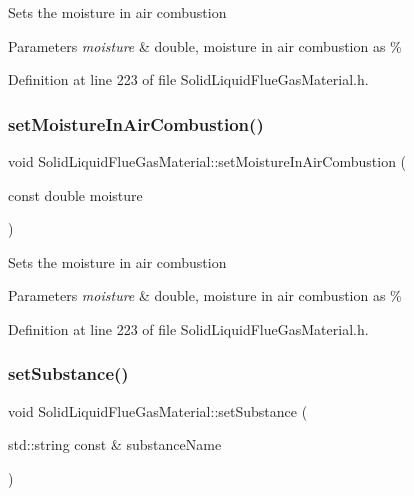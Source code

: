 Sets the moisture in air combustion 
\begin{DoxyParams}{Parameters}
{\em moisture} & double, moisture in air combustion as \% \\
\hline
\end{DoxyParams}


Definition at line 223 of file Solid\+Liquid\+Flue\+Gas\+Material.\+h.

\mbox{\label{class_solid_liquid_flue_gas_material_a1a5f1bd3008e78cce62edb8aca642284}} 
\subsubsection{\texorpdfstring{set\+Moisture\+In\+Air\+Combustion()}{setMoistureInAirCombustion()}\hspace{0.1cm}{\footnotesize\ttfamily [3/3]}}
{\footnotesize\ttfamily void Solid\+Liquid\+Flue\+Gas\+Material\+::set\+Moisture\+In\+Air\+Combustion (\begin{DoxyParamCaption}\item[{const double}]{moisture }\end{DoxyParamCaption})\hspace{0.3cm}{\ttfamily [inline]}}

Sets the moisture in air combustion 
\begin{DoxyParams}{Parameters}
{\em moisture} & double, moisture in air combustion as \% \\
\hline
\end{DoxyParams}


Definition at line 223 of file Solid\+Liquid\+Flue\+Gas\+Material.\+h.

\mbox{\label{class_solid_liquid_flue_gas_material_a54be915432c1300c4d8eaf7bf2be361f}} 
\subsubsection{\texorpdfstring{set\+Substance()}{setSubstance()}\hspace{0.1cm}{\footnotesize\ttfamily [1/3]}}
{\footnotesize\ttfamily void Solid\+Liquid\+Flue\+Gas\+Material\+::set\+Substance (\begin{DoxyParamCaption}\item[{std\+::string const \&}]{substance\+Name }\end{DoxyParamCaption})\hspace{0.3cm}{\ttfamily [inline]}}


